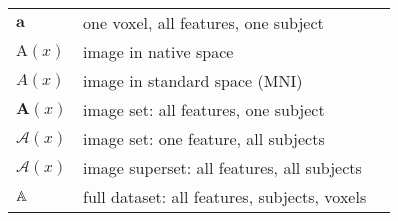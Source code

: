 \begin{singlespacing}
\begin{table}[H]
\begin{tabular}{lll}
  	$\bm{a}$              & one voxel, all features, one subject                                       &                     \\
  	$\mathrm{A}(x)$       & image in native space                                                      &                     \\
  	$A(x)$                & image in standard space (MNI)                                              &                     \\
  	$\bm{A}(x)$           & image set: all features, one subject                                       &                     \\
  	$\mathcal{A}(x)$      & image set: one feature, all subjects                                       &                     \\
  	$\bm{\mathcal{A}}(x)$ & image superset: all features, all subjects                                 &                     \\
  	$\mathbb{A}$               & full dataset: all features, subjects, voxels                               &                     \\ \hline
  \end{tabular}
\end{table}
\end{singlespacing}
\clearpage
{}
\setcounter{page}{1}
